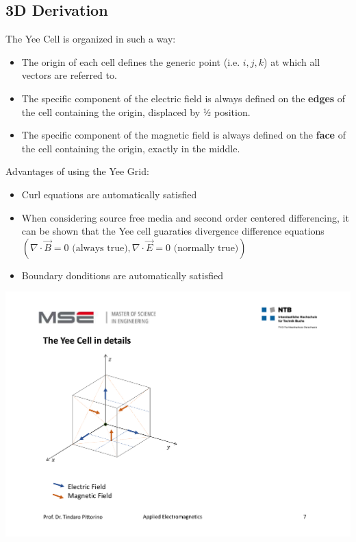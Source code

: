 \subsection{3D Derivation}
\begin{minipage}{12cm}
	The Yee Cell is organized in such a way: \\
	\begin{itemize}
		\item The origin of each cell defines the generic point (i.e. $i,j,k$) at which all vectors are referred to.
		\item The specific component of the electric field is always defined on the \textbf{edges} of the cell containing the origin, displaced by ½ position.
		\item The specific component of the magnetic field is always defined on the \textbf{face} of the cell containing the origin, exactly in the middle.
	\end{itemize}
	Advantages of using the Yee Grid: \\
	\begin{itemize}
		\item Curl equations are automatically satisfied
		\item When considering source free media and second order centered differencing, it can be shown that the Yee cell guaraties divergence difference equations \(\displaystyle \left(\nabla \cdot \vec{B} = 0 \textrm{ (always true)}, \nabla \cdot \vec{E} = 0 \textrm{ (normally true)} \right)\) 
		\item Boundary donditions are automatically satisfied
	\end{itemize}
\end{minipage}
\begin{minipage}{7cm}
	\begin{flushright}
	\includegraphics[width=.95\textwidth]{./images/Yee.pdf}
	\end{flushright}
\end{minipage}

